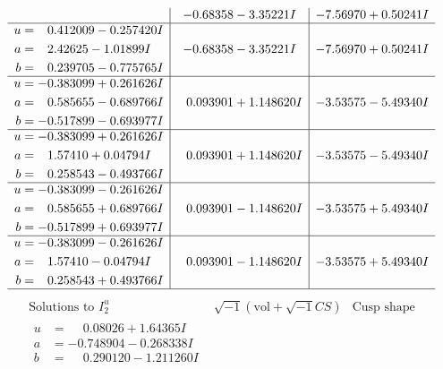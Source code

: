 \documentclass[1p]{elsarticle_modified}
\theoremstyle{definition}
\newcommand{\I}{\sqrt{-1}}
\begin{document}
$$\begin{array}{c|c|c}
 & -0.68358 - 3.35221 I & -7.56970 + 0.50241 I \\ \hline\begin{aligned}
u &= \phantom{-}0.412009 - 0.257420 I \\
a &= \phantom{-}2.42625 - 1.01899 I \\
b &= \phantom{-}0.239705 - 0.775765 I\end{aligned}
 & -0.68358 - 3.35221 I & -7.56970 + 0.50241 I \\ \hline\begin{aligned}
u &= -0.383099 + 0.261626 I \\
a &= \phantom{-}0.585655 - 0.689766 I \\
b &= -0.517899 - 0.693977 I\end{aligned}
 & \phantom{-}0.093901 + 1.148620 I & -3.53575 - 5.49340 I \\ \hline\begin{aligned}
u &= -0.383099 + 0.261626 I \\
a &= \phantom{-}1.57410 + 0.04794 I \\
b &= \phantom{-}0.258543 - 0.493766 I\end{aligned}
 & \phantom{-}0.093901 + 1.148620 I & -3.53575 - 5.49340 I \\ \hline\begin{aligned}
u &= -0.383099 - 0.261626 I \\
a &= \phantom{-}0.585655 + 0.689766 I \\
b &= -0.517899 + 0.693977 I\end{aligned}
 & \phantom{-}0.093901 - 1.148620 I & -3.53575 + 5.49340 I \\ \hline\begin{aligned}
u &= -0.383099 - 0.261626 I \\
a &= \phantom{-}1.57410 - 0.04794 I \\
b &= \phantom{-}0.258543 + 0.493766 I\end{aligned}
 & \phantom{-}0.093901 - 1.148620 I & -3.53575 + 5.49340 I\\
 \hline 
 \end{array}$$\newpage$$\begin{array}{c|c|c}  
\text{Solutions to }I^u_{2}& \I (\text{vol} + \sqrt{-1}CS) & \text{Cusp shape}\\
 \hline 
\begin{aligned}
u &= \phantom{-}0.08026 + 1.64365 I \\
a &= -0.748904 - 0.268338 I \\
b &= \phantom{-}0.290120 - 1.211260 I\end{aligned}

\end{array}$$
\end{document}
